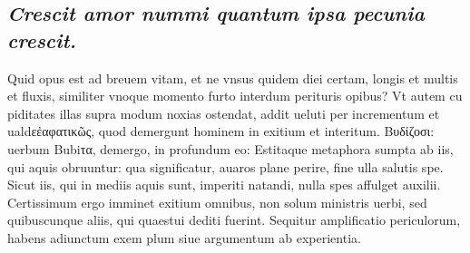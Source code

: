 \documentclass{article}
\begin{document}
\begin{pages}
\subsection*{\textit{Crescit amor nummi quantum ipsa pecunia crescit. }}\pstart Quid opus est ad breuem vitam, et ne vnsus quidem diei certam, longis et multis et fluxis, similiter vnoque momento furto interdum perituris opibus? Vt autem cu piditates illas supra modum noxias ostendat, addit ueluti per incrementum et ualdεἐαφατικῶς, quod demergunt hominem in exitium et interitum. Βυδίζοσι: uerbum Bubiτα, demergo, in profundum eo: Estitaque metaphora sumpta ab iis, qui aquis obruuntur: qua significatur, auaros plane perire, fine ulla salutis spe. Sicut iis, qui in mediis aquis sunt, imperiti natandi, nulla spes affulget auxilii. Certissimum ergo imminet exitium omnibus, non solum ministris uerbi, sed quibuscunque aliis, qui quaestui dediti fuerint. Sequitur amplificatio periculorum, habens adiunctum exem plum siue argumentum ab experientia.  \pend
{}
{}

\end{pages}
\end{document}
